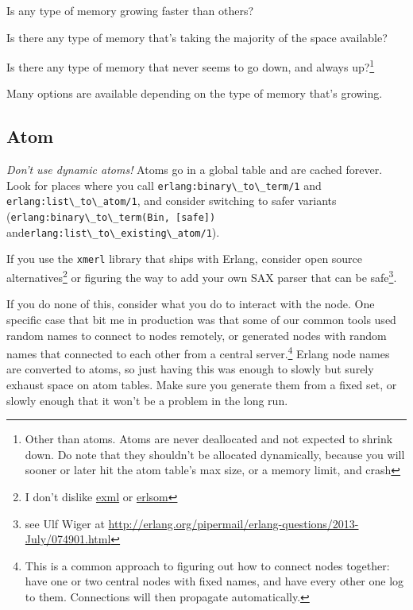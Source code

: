 \documentclass[11pt, oneside]{book}   	%
\newcommand{\otpapp}[1]{\Verb`#1`}
\newcommand{\function}[1]{\Verb`#1`}
\newcommand{\expression}[1]{\Verb`#1`}
\begin{document}
\begin{itemize*}
	\item Is any type of memory growing faster than others?
	\item Is there any type of memory that's taking the majority of the space available?
	\item Is there any type of memory that never seems to go down, and always up?\footnote{Other than atoms. Atoms are never deallocated and not expected to shrink down. Do note that they shouldn't be allocated dynamically, because you will sooner or later hit the atom table's max size, or a memory limit, and crash}
\end{itemize*}

Many options are available depending on the type of memory that's growing.

\subsection{Atom}

\emph{Don't use dynamic atoms!} Atoms go in a global table and are cached forever. Look for places where you call \function{erlang:binary\_to\_term/1} and \function{erlang:list\_to\_atom/1}, and consider switching to safer variants (\expression{erlang:binary\_to\_term(Bin, [safe])} and\newline \function{erlang:list\_to\_existing\_atom/1}).

If you use the \otpapp{xmerl} library that ships with Erlang, consider open source alternatives\footnote{I don't dislike \href{https://github.com/paulgray/exml}{exml} or \href{https://github.com/willemdj/erlsom}{erlsom}} or figuring the way to add your own SAX parser that can be safe\footnote{see Ulf Wiger at \href{http://erlang.org/pipermail/erlang-questions/2013-July/074901.html}{http://erlang.org/pipermail/erlang-questions/2013-July/074901.html}}. 

If you do none of this, consider what you do to interact with the node. One specific case that bit me in production was that some of our common tools used random names to connect to nodes remotely, or generated nodes with random names that connected to each other from a central server.\footnote{This is a common approach to figuring out how to connect nodes together: have one or two central nodes with fixed names, and have every other one log to them. Connections will then propagate automatically.} Erlang node names are converted to atoms, so just having this was enough to slowly but surely exhaust space on atom tables. Make sure you generate them from a fixed set, or slowly enough that it won't be a problem in the long run.
\end{document}
